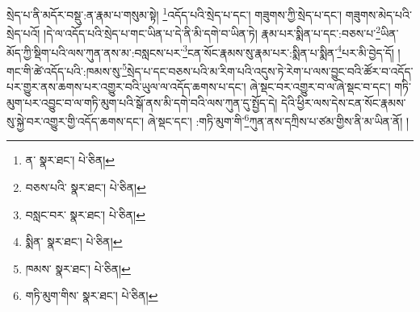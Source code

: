 སྲེད་པ་ནི་མདོར་བསྡུ་:ན་རྣམ་པ་གསུམ་སྟེ། \footnote{ན་  སྣར་ཐང་།  པེ་ཅིན། }འདོད་པའི་སྲེད་པ་དང་། གཟུགས་ཀྱི་སྲེད་པ་དང་། གཟུགས་མེད་པའི་སྲེད་པའོ། །དེ་ལ་འདོད་པའི་སྲེད་པ་གང་ཡིན་པ་དེ་ནི་མི་དགེ་བ་ཡིན་ཏེ། རྣམ་པར་སྨིན་པ་དང་:བཅས་པ་\footnote{བཅས་པའི་  སྣར་ཐང་།  པེ་ཅིན། }ཡིན་མོད་ཀྱི་སྡིག་པའི་ལས་ཀུན་ནས་མ་:བསླངས་པར་\footnote{བསླང་བར་  སྣར་ཐང་།  པེ་ཅིན། }ངན་སོང་རྣམས་སུ་རྣམ་པར་:སྨིན་པ་སྨིན་\footnote{སྨིན་  སྣར་ཐང་།  པེ་ཅིན། }པར་མི་བྱེད་དོ། །གང་གི་ཚེ་འདོད་པའི་:ཁམས་སུ་\footnote{ཁམས་  སྣར་ཐང་།  པེ་ཅིན། }སྲེད་པ་དང་བཅས་པའི་མ་རིག་པའི་འདུས་ཏེ་རེག་པ་ལས་བྱུང་བའི་ཚོར་བ་འདོད་པར་གྱུར་ནས་ཆགས་པར་འགྱུར་བའི་ཡུལ་ལ་འདོད་ཆགས་པ་དང་། ཞེ་སྡང་བར་འགྱུར་བ་ལ་ཞེ་སྡང་བ་དང་། གཏི་མུག་པར་འབྱུང་བ་ལ་གཏི་མུག་པའི་སྒོ་ནས་མི་དགེ་བའི་ལས་ཀུན་དུ་སྤྱོད་དེ། དེའི་ཕྱིར་ལས་དེས་ངན་སོང་རྣམས་སུ་སྐྱེ་བར་འགྱུར་གྱི་འདོད་ཆགས་དང་། ཞེ་སྡང་དང་། :གཏི་མུག་གི་\footnote{གཏི་མུག་གིས་  སྣར་ཐང་།  པེ་ཅིན། }ཀུན་ནས་དཀྲིས་པ་ཙམ་གྱིས་ནི་མ་ཡིན་ནོ། །
